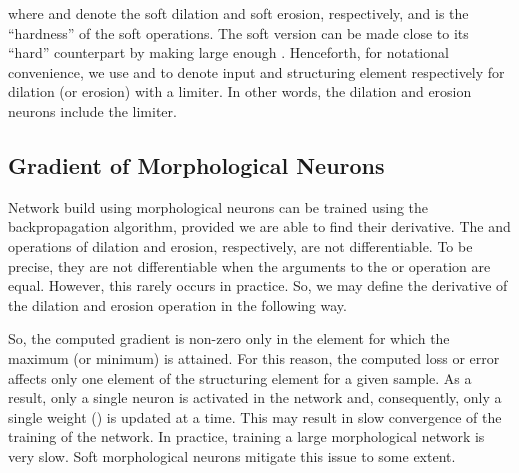 \documentclass{bmvc2k}
\begin{document}
where  and  denote the soft dilation and soft erosion, respectively, and  is the ``hardness'' of the soft operations. The soft version can be made close to its ``hard'' counterpart by making  large enough \cite{cook2011basic}. Henceforth, for notational convenience, we use  and  to denote input and structuring element respectively for dilation (or erosion) with a limiter. In other words, the dilation and erosion neurons include the limiter. 

\subsection{Gradient of Morphological Neurons} 
\label{sec:decision_boundary}
Network build using morphological neurons can be trained using the backpropagation algorithm, provided we are able to find their derivative.
The  and  operations of dilation and erosion, respectively, are not differentiable. To be precise, they are not differentiable when the arguments to the  or  operation are equal. However, this rarely occurs in practice. So, we may define the derivative of the dilation and erosion operation in the following way.

So, the computed gradient is non-zero only in the element for which the maximum (or minimum) is attained. For this reason, the computed loss or error affects only one element of the structuring element for a given sample. 
As a result, only a single neuron is activated in the network and, consequently, only a single weight () is updated at a time. 
This may result in slow convergence of the training of the network. In practice, training a large morphological network is very slow. Soft morphological neurons mitigate this issue to some extent. 
\end{document}
